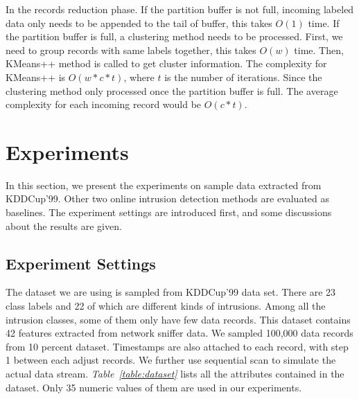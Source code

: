 \documentclass[runningheads]{llncs}
\begin{document}
	In the records reduction phase. If the partition buffer is not full, incoming labeled data only needs to be appended to the tail of buffer, this takes $O(1)$ time. If the partition buffer is full, a clustering method needs to be processed. First, we need to group records with same labels together, this takes $O(w)$ time. Then, KMeans++ method is called to get cluster information. The complexity for KMeans++ is $O(w*c*t)$, where $t$ is the number of iterations. Since the clustering method only processed once the partition buffer is full. The average complexity for each incoming record would be $O(c*t)$.
	
	\section{Experiments} \label{Experiments}
	In this section, we present the experiments on sample data extracted from KDDCup'99. Other two online intrusion detection methods are evaluated as baselines. The experiment settings are introduced first, and some discussions about the results are given.
	
	\subsection{Experiment Settings}
	
	The dataset we are using is sampled from KDDCup'99 data set. There are 23 class labels and 22 of which are different kinds of intrusions. Among all the intrusion classes, some of them only have few data records. This dataset contains 42 features extracted from network sniffer data. We sampled 100,000 data records from 10 percent dataset. Timestamps are also attached to each record, with step 1 between each adjust records. We further use sequential scan to simulate the actual data stream. \textit{Table~\ref{table:dataset}} lists all the attributes contained in the dataset. Only 35 numeric values of them are used in our experiments.
\end{document}
